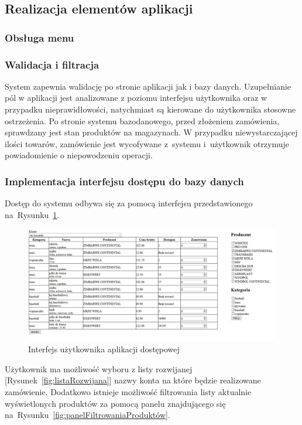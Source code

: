 \documentclass[a4paper, 12pt]{article}
\begin{document}
\subsection{Realizacja elementów aplikacji}
\subsubsection{Obsługa menu}
\subsubsection{Walidacja i filtracja}
System zapewnia walidację po stronie aplikacji jak i bazy danych. Uzupełnianie pól w aplikacji jest analizowane z poziomu interfejsu użytkownika oraz w przypadku nieprawidłowości, natychmiast są kierowane do użytkownika stosowne ostrzeżenia. Po stronie systemu bazodanowego, przed złożeniem zamówienia, sprawdzany jest stan produktów na magazynach. W przypadku niewystarczającej ilości towarów, zamówienie jest wycofywane z~systemu i~użytkownik otrzymuje powiadomienie o niepowodzeniu operacji.
\subsubsection{Implementacja interfejsu dostępu do bazy danych}
Dostęp do systemu odbywa się za pomocą interfejsu przedstawionego na~Rysunku~\ref{fig:interfejsUżytkownika}.

\begin{figure}[H]
	\includegraphics[width=14cm]{Screeny/Filtrowanie2.JPG}
	\caption[Interfejs użytkownika]{Interfejs użytkownika aplikacji dostępowej}
	\label{fig:interfejsUżytkownika}
\end{figure}

Użytkownik ma możliwość wyboru z listy rozwijanej [Rysunek~\ref{fig:listaRozwijana}] nazwy konta na które będzie realizowane zamówienie. Dodatkowo istnieje możliwość filtrowania listy aktualnie wyświetlonych produktów za pomocą panelu znajdującego się na~Rysunku~\ref{fig:panelFiltrowaniaProduktów}.
\end{document}
